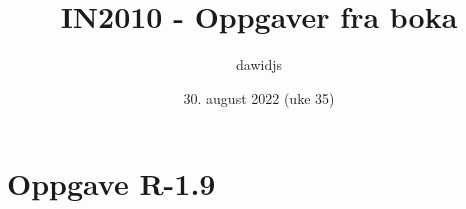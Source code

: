 \documentclass{in1150-innlevering}
\title{\vspace{-3cm}IN2010 - Oppgaver fra boka}
\author{dawidjs}
\date{30. august 2022 (uke 35)}
\begin{document}
	\maketitle
	
	
	\section*{}
	\section*{Oppgave R-1.9}
	
	
	
\end{document}
